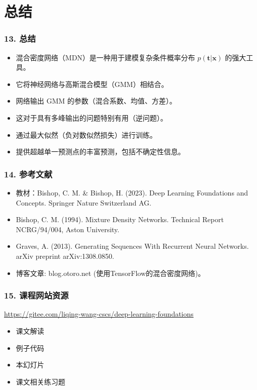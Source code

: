 \documentclass[t,aspectratio=169]{beamer} %
\begin{document}
\section{总结}
\begin{frame}
    \frametitle{13. 总结}
    \begin{itemize}
        \item 混合密度网络（MDN）是一种用于建模复杂条件概率分布 $ p(\mathbf{t} | \mathbf{x}) $ 的强大工具。
        \item 它将神经网络与高斯混合模型（GMM）相结合。
        \item 网络输出 GMM 的参数（混合系数、均值、方差）。
        \item 这对于具有多峰输出的问题特别有用（逆问题）。
        \item 通过最大似然（负对数似然损失）进行训练。
        \item 提供超越单一预测点的丰富预测，包括不确定性信息。
    \end{itemize}
\end{frame}

\begin{frame}
    \frametitle{14. 参考文献}
    \begin{itemize}
        \item 教材：Bishop, C. M. \& Bishop, H. (2023). Deep Learning Foundations and Concepts. Springer Nature Switzerland AG. 
        \item Bishop, C. M. (1994). Mixture Density Networks. Technical Report NCRG/94/004, Aston University.
        \item Graves, A. (2013). Generating Sequences With Recurrent Neural Networks. arXiv preprint arXiv:1308.0850.
        \item 博客文章: blog.otoro.net (使用TensorFlow的混合密度网络)。
    \end{itemize}
\end{frame}

\begin{frame}
    \frametitle{15. 课程网站资源}
    \begin{center}
    \url{https://gitee.com/liqing-wang-cscs/deep-learning-foundations} 
    \end{center}

    \begin{itemize}
        \item 课文解读
        \item 例子代码
        \item 本幻灯片
        \item 课文相关练习题
    \end{itemize}
\end{frame}
\end{document}
